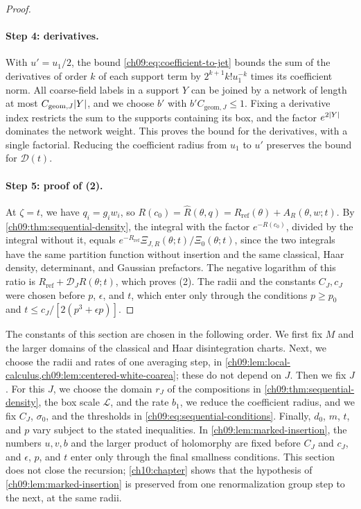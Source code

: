 \begin{proof}
\paragraph{Step 4: derivatives.}
With $u'=u_1/2$, the bound \eqref{ch09:eq:coefficient-to-jet} bounds the sum of the derivatives of order $k$ of each support term by $2^{k+1}k!u_1^{-k}$ times its coefficient norm. All coarse-field labels in a support $Y$ can be joined by a network of length at most $C_{\mathrm{geom},J}\lvert Y\rvert$, and we choose $b'$ with $b'C_{\mathrm{geom},J}\le1$. Fixing a derivative index restricts the sum to the supports containing its box, and the factor $e^{2\lvert Y\rvert}$ dominates the network weight. This proves the bound for the derivatives, with a single factorial. Reducing the coefficient radius from $u_1$ to $u'$ preserves the bound for $\boldsymbol{\mathcal D}(t)$.

\paragraph{Step 5: proof of (2).}
At $\zeta=t$, we have $q_i=g_iw_i$, so $R(c_0)=\widehat R(\theta,q)=R_{\mathrm{ref}}(\theta)+A_R(\theta,w;t)$. By \cref{ch09:thm:sequential-density}, the integral with the factor $e^{-R(c_0)}$, divided by the integral without it, equals $e^{-R_{\mathrm{ref}}}\Xi_{J,R}(\theta;t)/\Xi_0(\theta;t)$, since the two integrals have the same partition function without insertion and the same classical, Haar density, determinant, and Gaussian prefactors. The negative logarithm of this ratio is $R_{\mathrm{ref}}+\mathcal D_JR(\theta;t)$, which proves (2). The radii and the constants $C_J,c_J$ were chosen before $p$, $\epsilon$, and $t$, which enter only through the conditions $p\ge p_0$ and $t\le c_J/[2(p^3+\epsilon p)]$.
\end{proof}

\begin{remark}\label{ch09:rem:order-of-choices}
The constants of this section are chosen in the following order. We first fix $M$ and the larger domains of the classical and Haar disintegration charts. Next, we choose the radii and rates of one averaging step, in \cref{ch09:lem:local-calculus,ch09:lem:centered-white-coarea}; these do not depend on $J$. Then we fix $J$. For this $J$, we choose the domain $r_J$ of the compositions in \cref{ch09:thm:sequential-density}, the box scale $\mathscr L$, and the rate $b_1$, we reduce the coefficient radius, and we fix $C_J$, $\sigma_0$, and the thresholds in \eqref{ch09:eq:sequential-conditions}. Finally, $d_0$, $m$, $t$, and $p$ vary subject to the stated inequalities. In \cref{ch09:lem:marked-insertion}, the numbers $u,v,b$ and the larger product of holomorphy are fixed before $C_J$ and $c_J$, and $\epsilon$, $p$, and $t$ enter only through the final smallness conditions. This section does not close the recursion; \cref{ch10:chapter} shows that the hypothesis of \cref{ch09:lem:marked-insertion} is preserved from one renormalization group step to the next, at the same radii.
\end{remark}

